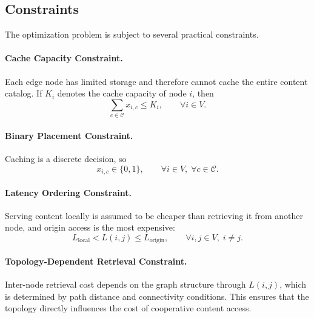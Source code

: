 \subsection{Constraints}

The optimization problem is subject to several practical constraints.

\paragraph{Cache Capacity Constraint.}
Each edge node has limited storage and therefore cannot cache the entire content catalog. If \(K_i\) denotes the cache capacity of node \(i\), then
\[
\sum_{c \in \mathcal{C}} x_{i,c} \le K_i,
\qquad \forall i \in V.
\]

\paragraph{Binary Placement Constraint.}
Caching is a discrete decision, so
\[
x_{i,c} \in \{0,1\},
\qquad \forall i \in V,\; \forall c \in \mathcal{C}.
\]

\paragraph{Latency Ordering Constraint.}
Serving content locally is assumed to be cheaper than retrieving it from another node, and origin access is the most expensive:
\[
L_{\text{local}} < L(i,j) \le L_{\text{origin}},
\qquad \forall i,j \in V,\; i \neq j.
\]

\paragraph{Topology-Dependent Retrieval Constraint.}
Inter-node retrieval cost depends on the graph structure through \(L(i,j)\), which is determined by path distance and connectivity conditions. This ensures that the topology directly influences the cost of cooperative content access.


